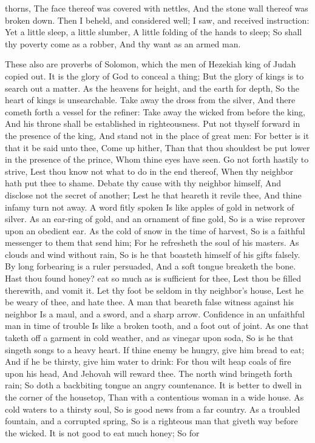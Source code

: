 thorns, The face thereof was covered with nettles, And the stone wall thereof was broken down.  Then I beheld, and considered well; I saw, and received instruction:  Yet a little sleep, a little slumber, A little folding of the hands to sleep;  So shall thy poverty come as a robber, And thy want as an armed man. 

These also are proverbs of Solomon, which the men of Hezekiah king of Judah copied out.  It is the glory of God to conceal a thing; But the glory of kings is to search out a matter.  As the heavens for height, and the earth for depth, So the heart of kings is unsearchable.  Take away the dross from the silver, And there cometh forth a vessel for the refiner:  Take away the wicked from before the king, And his throne shall be established in righteousness.  Put not thyself forward in the presence of the king, And stand not in the place of great men:  For better is it that it be said unto thee, Come up hither, Than that thou shouldest be put lower in the presence of the prince, Whom thine eyes have seen.  Go not forth hastily to strive, Lest thou know not what to do in the end thereof, When thy neighbor hath put thee to shame.  Debate thy cause with thy neighbor himself, And disclose not the secret of another;  Lest he that heareth it revile thee, And thine infamy turn not away.  A word fitly spoken Is like apples of gold in network of silver.  As an ear-ring of gold, and an ornament of fine gold, So is a wise reprover upon an obedient ear.  As the cold of snow in the time of harvest, So is a faithful messenger to them that send him; For he refresheth the soul of his masters.  As clouds and wind without rain, So is he that boasteth himself of his gifts falsely.  By long forbearing is a ruler persuaded, And a soft tongue breaketh the bone.  Hast thou found honey? eat so much as is sufficient for thee, Lest thou be filled therewith, and vomit it.  Let thy foot be seldom in thy neighbor’s house, Lest he be weary of thee, and hate thee.  A man that beareth false witness against his neighbor Is a maul, and a sword, and a sharp arrow.  Confidence in an unfaithful man in time of trouble Is like a broken tooth, and a foot out of joint.  As one that taketh off a garment in cold weather, and as vinegar upon soda, So is he that singeth songs to a heavy heart.  If thine enemy be hungry, give him bread to eat; And if he be thirsty, give him water to drink:  For thou wilt heap coals of fire upon his head, And Jehovah will reward thee.  The north wind bringeth forth rain; So doth a backbiting tongue an angry countenance.  It is better to dwell in the corner of the housetop, Than with a contentious woman in a wide house.  As cold waters to a thirsty soul, So is good news from a far country.  As a troubled fountain, and a corrupted spring, So is a righteous man that giveth way before the wicked.  It is not good to eat much honey; So for 